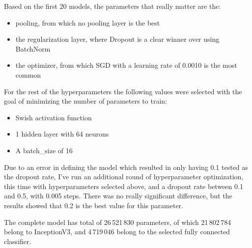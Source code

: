 \documentclass{article}
\begin{document}
Based on the first 20 models, the parameters that really matter are the:
\begin{itemize}
  \item  pooling, from which no pooling layer is the best
  \item  the regularization layer, where Dropout is a clear winner over using BatchNorm
  \item  the optimizer, from which SGD with a learning rate of 0.0010 is the most common
\end{itemize}
For the rest of the hyperparameters the following values were selected  with the goal of minimizing the number of parameters to train:
\begin{itemize}
  \item  Swish activation function
  \item  1 hidden layer with 64 neurons
  \item  A batch\_size of 16
\end{itemize}

Due to an error in defining the model which resulted in only having 0.1 tested as the dropout rate, I've run an additional round of hyperparameter optimization, this time with hyperparameters selected above, and a dropout rate between 0.1 and 0.5, with 0.005 steps. There was no really significant difference, but the results showed that 0.2 is the best value for this parameter.

The complete model has total of 26\,521\,830 parameters, of which 21\,802\,784 belong to InceptionV3, and 4\,719\,046 belong to the selected fully connected classifier.
\end{document}
